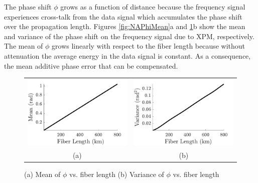 The phase shift $\phi$ grows as a function of distance because the frequency signal experiences cross-talk from the data signal which accumulates the phase shift over the propagation length. Figures \ref{fig:NAPhiMean}a and \ref{fig:NAPhiVar}b show the mean and variance of the phase shift on the frequency signal due to XPM, respectively. The mean of $\phi$ grows linearly with respect to the fiber length because without attenuation the average energy in the data signal is constant. As a consequence, the mean additive phase error that can be compensated.
%
\begin{figure}[htb]
	\begin{tabular}{c c}
		\includegraphics[width=0.5\linewidth]{img/NAPhiMean} & \includegraphics[width=0.5\linewidth]{img/NAPhiVar} \\
		(a) & (b)
	\end{tabular}
	\caption{(a)\label{fig:NAPhiMean} Mean of $\phi$ vs. fiber length (b)\label{fig:NAPhiVar} Variance of $\phi$ vs. fiber length}
\end{figure}
%

